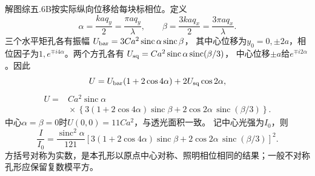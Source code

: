 \documentclass[UTF8,fontset=fandol,a4paper,11pt]{ctexart}
\begin{document}
解图综五.6B按实际纵向位移给每块标相位。定义
\[
\alpha=\frac{kaq_y}{2}=\frac{\pi aq_y}{\lambda},\qquad
\beta=\frac{3kaq_x}{2}=\frac{3\pi aq_x}{\lambda}.
\]
三个水平矩孔各有振幅
$U_{\rm bar}=3Ca^2\operatorname{sinc}\alpha\operatorname{sinc}\beta$，
其中心位移为$y_0=0,\pm2a$，相位因子为$1,e^{\mp i4\alpha}$。两个方孔各有
$U_{\rm sq}=Ca^2\operatorname{sinc}\alpha\operatorname{sinc}(\beta/3)$，
中心位移$\pm a$给$e^{\mp i2\alpha}$。因此
\[
U=U_{\rm bar}(1+2\cos4\alpha)+2U_{\rm sq}\cos2\alpha,
\]
\[
\boxed{\begin{aligned}
U={}&Ca^2\operatorname{sinc}\alpha\\
&{}\times\left\{
3(1+2\cos4\alpha)\operatorname{sinc}\beta
+2\cos2\alpha\,\operatorname{sinc}(\beta/3)
\right\}.
\end{aligned}}
\]
中心$\alpha=\beta=0$时$U(0,0)=11Ca^2$，与透光面积一致。
记中心光强为$I_0$，则
\[
\boxed{\frac I{I_0}=
\frac{\operatorname{sinc}^2\alpha}{121}
\left[
3(1+2\cos4\alpha)\operatorname{sinc}\beta
+2\cos2\alpha\,\operatorname{sinc}(\beta/3)
\right]^2}.
\]
方括号对称为实数，是本孔形以原点中心对称、照明相位相同的结果；一般不对称孔形应保留复数模平方。
\end{document}
